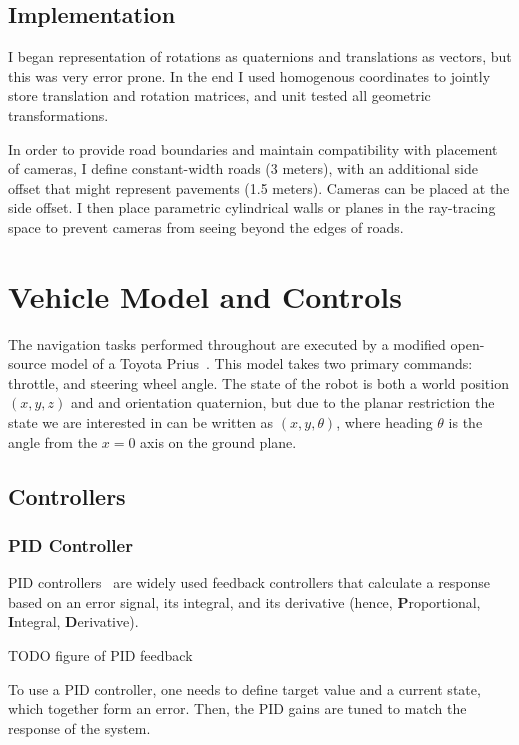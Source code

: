 \documentclass[a4paper,12pt,twoside,openright]{report}
\begin{document}
\subsection{Implementation}

I began representation of rotations as
quaternions and translations as vectors, but this was very error prone. 
In the end I used homogenous coordinates to jointly store translation
and rotation matrices, and unit tested all geometric transformations.

In order to provide road boundaries and 
maintain compatibility with placement of cameras, I define
constant-width roads (3 meters), with an additional side offset that
might represent pavements (1.5 meters). Cameras can be placed at the 
side offset. I then place parametric cylindrical walls
or planes in the ray-tracing space to prevent cameras from
seeing beyond the edges of roads.


\section{Vehicle Model and Controls}
\label{sec:impl:vehicle}

The navigation tasks performed throughout are executed by a modified
open-source model of a Toyota Prius~\cite{osrfPrius}. This model
takes two primary commands: throttle, and steering wheel angle.
The state of the robot is both a world position $(x,y,z)$ and
and orientation quaternion, but due to the planar restriction
the state we are interested in can be written as
$(x,y, \theta)$, where heading $\theta$ is the angle from the $x=0$ axis 
on the ground plane.

\subsection{Controllers}

\subsubsection{PID Controller}
PID controllers~\cite{aastrom1995pid} are widely used feedback controllers
that calculate a response based on an error signal, its integral, and its derivative
(hence, \textbf{P}roportional, \textbf{I}ntegral, \textbf{D}erivative).

TODO figure of PID feedback

To use a PID controller, one needs to define target value and a current state,
which together form an error. Then, the PID gains are tuned to match
the response of the system.
\end{document}
